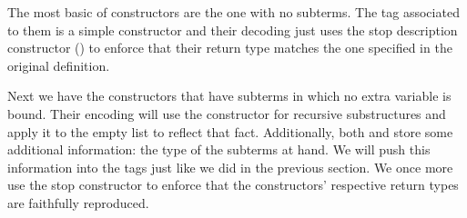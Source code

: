 \noindent\begin{minipage}[t]{0.4\textwidth}
\end{minipage}\begin{minipage}[t]{0.6\textwidth}
  \begin{AgdaSuppressSpace}
  \end{AgdaSuppressSpace}
\end{minipage}

The most basic of constructors are the one with no subterms. The tag
associated to them is a simple constructor and their decoding just
uses the stop description constructor () to enforce that
their return type matches the one specified in the original definition.

\noindent\begin{minipage}[t]{0.4\textwidth}
\end{minipage}\begin{minipage}[t]{0.6\textwidth}
  \begin{AgdaSuppressSpace}
  \end{AgdaSuppressSpace}
\end{minipage}

Next we have the constructors that have subterms in which no extra variable
is bound. Their encoding will use the constructor for recursive substructures
and apply it to the empty list to reflect that fact. Additionally, both
 and  store some additional information: the type of
the subterms at hand. We will push this information into the tags just like
we did in the previous section. We once more use the stop constructor to
enforce that the constructors' respective return types are faithfully
reproduced.

\noindent\begin{minipage}[t]{0.4\textwidth}
\end{minipage}\begin{minipage}[t]{0.6\textwidth}
  \begin{AgdaSuppressSpace}
  \end{AgdaSuppressSpace}
\end{minipage}

